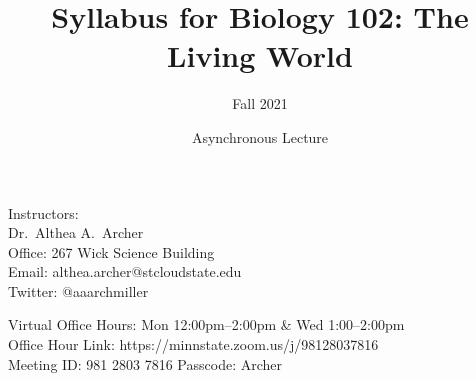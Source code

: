\documentclass{tufte-handout}
\title{Syllabus for Biology 102: The Living World}										%
\author{Fall 2021}								%
\date{Asynchronous Lecture}
\begin{document}
\maketitle

Instructors:  \\
Dr.~Althea A.~Archer\\
Office: 267 Wick Science Building\\
Email: althea.archer@stcloudstate.edu\\
Twitter: @aaarchmiller

\color{gray} Virtual Office Hours: Mon 12:00pm--2:00pm \& Wed 1:00--2:00pm\\
Office Hour Link: https://minnstate.zoom.us/j/98128037816\\
Meeting ID: 981 2803 7816 Passcode: Archer \color{black}
\end{document}

